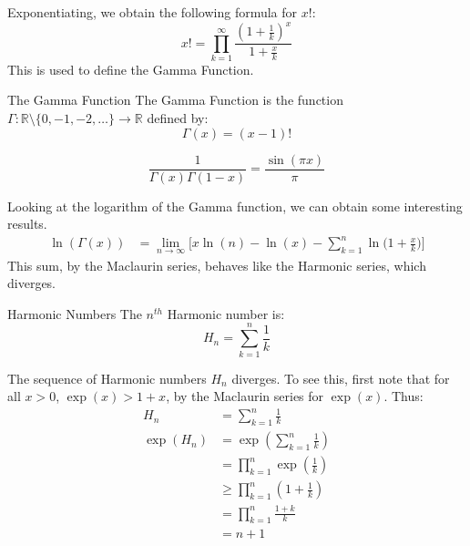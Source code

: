 \documentclass[crop=false,class=book,oneside]{standalone}
\begin{document}
        Exponentiating, we obtain the following formula for $x!$:
        \begin{equation}
            x!=\prod_{k=1}^{\infty}\frac{(1+\frac{1}{k})^{x}}{1+\frac{x}{k}}
        \end{equation}
        This is used to define the Gamma Function.
        \begin{ldefinition}{The Gamma Function}
            The Gamma Function is the function
            $\Gamma:\mathbb{R}\setminus\{0,\minus{1},\minus{2},\dots\}\rightarrow\mathbb{R}$
            defined by:
            \begin{equation}
                \Gamma(x)=(x-1)!
            \end{equation}
        \end{ldefinition}
        \begin{theorem}
            \begin{equation}
                \frac{1}{\Gamma(x)\Gamma(1-x)}=\frac{\sin(\pi{x})}{\pi}
            \end{equation}
        \end{theorem}
        Looking at the logarithm of the Gamma function, we can obtain some interesting
        results.
        \begin{align}
            \ln(\Gamma(x))&=
            \underset{n\rightarrow\infty}{\lim}\Big[
                x\ln(n)-\ln(x)-\sum_{k=1}^{n}\ln\big(1+\frac{x}{k}\big)\Big]
        \end{align}
        This sum, by the Maclaurin series, behaves like the Harmonic series, which
        diverges.
        \begin{ldefinition}{Harmonic Numbers}
            The $n^{th}$ Harmonic number is:
            \begin{equation}
                H_{n}=\sum_{k=1}^{n}\frac{1}{k}
            \end{equation}
        \end{ldefinition}
        The sequence of Harmonic numbers $H_{n}$ diverges. To see this, first note that
        for all $x>0$, $\exp(x)>1+x$, by the Maclaurin series for $\exp(x)$. Thus:
        \begin{align}
            H_{n}&=\sum_{k=1}^{n}\frac{1}{k}\\
            \exp(H_{n})&=\exp(\sum_{k=1}^{n}\frac{1}{k})\\
            &=\prod_{k=1}^{n}\exp(\frac{1}{k})\\
            &\geq\prod_{k=1}^{n}(1+\frac{1}{k})\\
            &=\prod_{k=1}^{n}\frac{1+k}{k}\\
            &=n+1
        \end{align}
\end{document}
